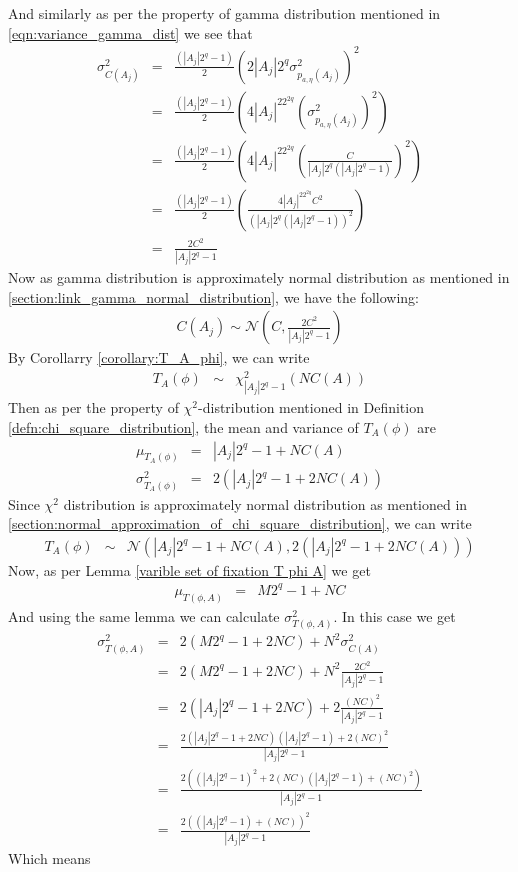 And similarly as per the property of gamma distribution mentioned in \ref{eqn:variance_gamma_dist} we see that 
\begin{eqnarray*}
\sigma^2_{C(A_j)} &=& \frac{(|A_j|2^q-1)}{2}\left(2|A_j|2^q\sigma^2_{p_{a,\eta}(A_j)}\right)^2\\
&=& \frac{(|A_j|2^q-1)}{2}\left(4|A_j|^22^{2q}\left(\sigma^2_{p_{a,\eta}(A_j)}\right)^2\right)\\
&=& \frac{(|A_j|2^q-1)}{2}\left(4|A_j|^22^{2q}\left(\frac{C}{|A_j|2^{q}(|A_j|2^q-1)}\right)^2\right)\\
&=& \frac{(|A_j|2^q-1)}{2}\left(\frac{4|A_j|^22^{2q}C^2}{(|A_j|2^{q}(|A_j|2^q-1))^2}\right)\\
&=& \frac{2C^2}{|A_j|2^q-1}
\end{eqnarray*}
Now as gamma distribution is approximately normal distribution as mentioned in \ref{section:link_gamma_normal_distribution}, we have the following:
\begin{eqnarray*}
C(A_j) \sim \mathcal{N}\left(C,\frac{2C^2}{|A_j|2^q-1}\right)
\end{eqnarray*}
By Corollarry \ref{corollary:T_A_phi}, we can write
\begin{eqnarray*}
T_{A}(\phi) &\sim & \chi^2_{|A_j|2^q-1}(NC(A))
\end{eqnarray*}Then as per the property of $\chi^2$-distribution mentioned in Definition \ref{defn:chi_square_distribution}, the mean and variance of $T_{A}(\phi)$ are
\begin{eqnarray*}
\mu_{T_{A}(\phi)} &=& |A_j|2^q-1+NC(A)\\
\sigma^2_{T_{A}(\phi)} &=& 2\left(|A_j|2^q-1+2NC(A)\right)
\end{eqnarray*}Since $\chi^2$ distribution is approximately normal distribution as mentioned in \ref{section:normal_approximation_of_chi_square_distribution}, we can write
\begin{eqnarray}
T_{A}(\phi) &\sim & \mathcal{N}\left(|A_j|2^q-1+NC(A),2(|A_j|2^q-1+2NC(A))\right)
\end{eqnarray} Now, as per Lemma \ref{varible set of fixation T phi A} we get
\begin{eqnarray*}
\mu_{T\left(\phi,A\right)} &=& M2^q-1 + NC
\end{eqnarray*}
And using the same lemma we can calculate $\sigma^2_{T\left(\phi,A\right)}$. In this case we get
\begin{eqnarray*}
\sigma^{2}_{T\left(\phi,A\right)} &=& 2(M2^q-1+2NC) + N^2\sigma_{C(A)}^{2}\\
&=& 2(M2^q-1+2NC) + N^2\frac{2C^2}{|A_j|2^q-1}\\
&=& 2(|A_j|2^q-1+2NC) + 2\frac{(NC)^2}{|A_j|2^q-1}\\
&=& \frac{2(|A_j|2^q-1+2NC)(|A_j|2^q-1)+2(NC)^2}{|A_j|2^q-1}\\
&=& \frac{2((|A_j|2^q-1)^2+2(NC)(|A_j|2^q-1)+(NC)^2)}{|A_j|2^q-1}\\
&=& \frac{2((|A_j|2^q-1)+(NC))^2}{|A_j|2^q-1}
\end{eqnarray*}Which means 
